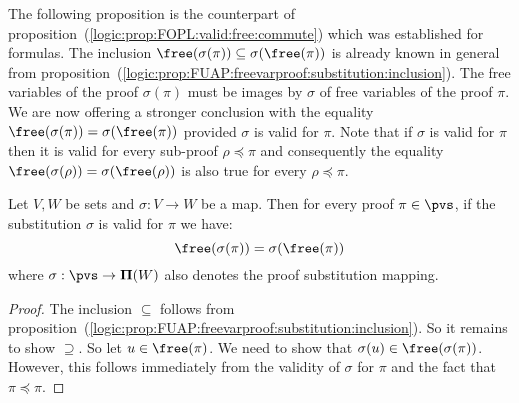 The following proposition is the counterpart of
proposition~(\ref{logic:prop:FOPL:valid:free:commute}) which was
established for formulas. The inclusion
$\free(\sigma(\pi))\subseteq\sigma(\free(\pi))$ is already known in
general from
proposition~(\ref{logic:prop:FUAP:freevarproof:substitution:inclusion}).
The free variables of the proof $\sigma(\pi)$ must be images by
$\sigma$ of free variables of the proof $\pi$. We are now offering a
stronger conclusion with the equality
$\free(\sigma(\pi))=\sigma(\free(\pi))$ provided $\sigma$ is valid
for $\pi$. Note that if $\sigma$ is valid for $\pi$ then it is valid
for every sub-proof $\rho\preceq\pi$ and consequently the equality
$\free(\sigma(\rho))=\sigma(\free(\rho))$ is also true for every
$\rho\preceq\pi$.
\begin{prop}\label{logic:prop:FUAP:validsubproof:freevar}
Let $V, W$ be sets and $\sigma:V\to W$ be a map. Then for every
proof $\pi\in\pvs$, if  the substitution $\sigma$ is valid for $\pi$
we have:
    \[
    \free(\sigma(\pi))=\sigma(\free(\pi))
    \]
where $\sigma:\pvs\to{\bf\Pi}(W)$ also denotes the proof
substitution mapping.
\end{prop}
\begin{proof}
The inclusion $\subseteq$ follows from
proposition~(\ref{logic:prop:FUAP:freevarproof:substitution:inclusion}).
So it remains to show $\supseteq$. So let $u\in\free(\pi)$. We need
to show that $\sigma(u)\in\free(\sigma(\pi))$. However, this follows
immediately from the validity of $\sigma$ for $\pi$ and the fact
that $\pi\preceq\pi$.
\end{proof}


